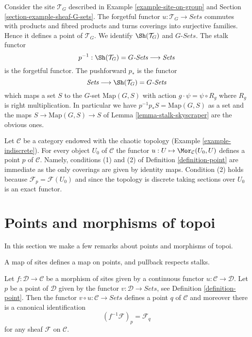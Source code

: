 \begin{example}
\label{example-point-G-sets}
Consider the site $\mathcal{T}_G$ described in
Example \ref{example-site-on-group} and
Section \ref{section-example-sheaf-G-sets}.
The forgetful functor $u : \mathcal{T}_G \to \textit{Sets}$
commutes with products and fibred products and turns
coverings into surjective families. Hence it defines a point
of $\mathcal{T}_G$. We identify $\Sh(\mathcal{T}_G)$
and $G\textit{-Sets}$. The stalk functor
$$
p^{-1} :
\Sh(\mathcal{T}_G) = G\textit{-Sets}
\longrightarrow
\textit{Sets}
$$
is the forgetful functor. The pushforward $p_*$ is the
functor
$$
\textit{Sets}
\longrightarrow
\Sh(\mathcal{T}_G) = G\textit{-Sets}
$$
which maps a set $S$ to the $G$-set $\text{Map}(G, S)$ with
action $g \cdot \psi = \psi \circ R_g$ where $R_g$ is right
multiplication. In particular we have
$p^{-1}p_*S = \text{Map}(G, S)$ as a set and the maps
$S \to \text{Map}(G, S) \to S$ of
Lemma \ref{lemma-stalk-skyscraper}
are the obvious ones.
\end{example}

\begin{example}
\label{example-indiscrete-points}
Let $\mathcal{C}$ be a category endowed with the chaotic topology
(Example \ref{example-indiscrete}). For every object $U_0$ of $\mathcal{C}$
the functor $u : U \mapsto \Mor_\mathcal{C}(U_0, U)$ defines a point
$p$ of $\mathcal{C}$. Namely, conditions (1) and (2) of
Definition \ref{definition-point} are immediate as the only coverings
are given by identity maps. Condition (2) holds because
$\mathcal{F}_p = \mathcal{F}(U_0)$ and since the topology is discrete
taking sections over $U_0$ is an exact functor.
\end{example}





\section{Points and morphisms of topoi}
\label{section-functorial-points}

\noindent
In this section we make a few remarks about points and morphisms
of topoi.

\begin{lemma}
\label{lemma-point-morphism-sites}
\begin{slogan}
A map of sites defines a map on points, and pullback respects stalks.
\end{slogan}
Let $f : \mathcal{D} \to \mathcal{C}$ be a morphism of sites
given by a continuous functor $u : \mathcal{C} \to \mathcal{D}$.
Let $p$ be a point of $\mathcal{D}$ given by the functor
$v : \mathcal{D} \to \textit{Sets}$, see
Definition \ref{definition-point}.
Then the functor $v \circ u : \mathcal{C} \to \textit{Sets}$
defines a point $q$ of $\mathcal{C}$ and moreover there is
a canonical identification
$$
(f^{-1}\mathcal{F})_p = \mathcal{F}_q
$$
for any sheaf $\mathcal{F}$ on $\mathcal{C}$.
\end{lemma}


